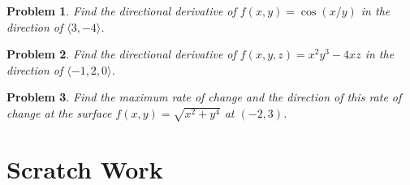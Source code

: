\documentclass[11pt]{article}
\newtheorem{problem}{Problem}
\begin{document}
\vspace{5cm}

\begin{problem}
    Find the directional derivative of $f(x,y) = \cos(x/y)$ in the direction of $\langle 3, -4 \rangle$.
\end{problem}

\vspace{5cm}


\begin{problem}
        Find the directional derivative of $f(x,y,z) = x^2y^3-4xz$ in the direction of $\langle -1, 2, 0 \rangle$.
\end{problem}

\vspace{5cm}

\begin{problem}
    Find the maximum rate of change and the direction of this rate of change at the surface $f(x,y) = \sqrt{x^2 + y^4}$ at $(-2,3)$.
\end{problem}




\newpage

\section{Scratch Work}
\end{document}

